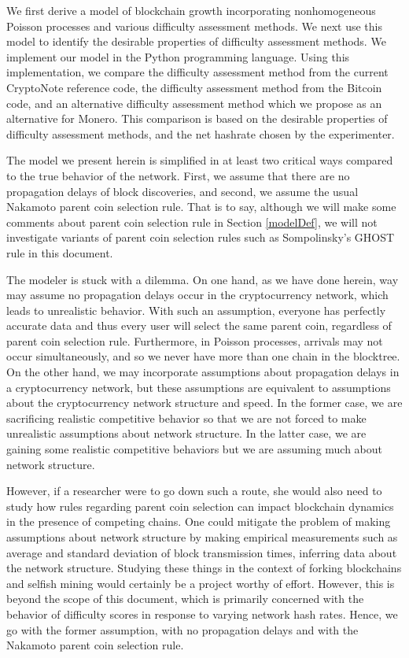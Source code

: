 \documentclass[12pt,english]{mrl}
\theoremstyle{definition}
\numberwithin{equation}{section}
\numberwithin{figure}{section}
\numberwithin{equation}{section}
\numberwithin{equation}{section}
\numberwithin{figure}{section}
\begin{document}
We first derive a model of blockchain growth incorporating nonhomogeneous Poisson processes and various difficulty assessment methods. We next use this model to identify the desirable properties of difficulty assessment methods. We implement our model in the Python programming language. Using this implementation, we compare the difficulty assessment method from the current CryptoNote reference code, the difficulty assessment method from the Bitcoin code, and an alternative difficulty assessment method which we propose as an alternative for Monero. This comparison is based on the desirable properties of difficulty assessment methods, and the net hashrate chosen by the experimenter.

The model we present herein is simplified in at least two critical ways compared to the true behavior of the network. First, we assume that there are no propagation delays of block discoveries, and second, we assume the usual Nakamoto parent coin selection rule. That is to say, although we will make some comments about parent coin selection rule in Section \ref{modelDef}, we will not investigate variants of parent coin selection rules such as Sompolinsky's GHOST rule in this document.

The modeler is stuck with a dilemma. On one hand, as we have done herein, way may assume no propagation delays occur in the cryptocurrency network, which leads to unrealistic behavior. With such an assumption, everyone has perfectly accurate data and thus every user will select the same parent coin, regardless of parent coin selection rule. Furthermore, in Poisson processes, arrivals may not occur simultaneously, and so we never have more than one chain in the blocktree. On the other hand, we may incorporate assumptions about propagation delays in a cryptocurrency network, but these assumptions are equivalent to assumptions about the cryptocurrency network structure and speed. In the former case, we are sacrificing realistic competitive behavior so that we are not forced to make unrealistic assumptions about network structure. In the latter case, we are gaining some realistic competitive behaviors but we are assuming much about network structure. 

However, if a researcher were to go down such a route, she would also need to study how rules regarding parent coin selection can impact blockchain dynamics in the presence of competing chains.  One could mitigate the problem of making assumptions about network structure by making empirical measurements such as average and standard deviation of block transmission times,  inferring data about the network structure. Studying these things in the context of forking blockchains and selfish mining would certainly be a project worthy of effort. However, this is beyond the scope of this document, which is primarily concerned with the behavior of difficulty scores in response to varying network hash rates. Hence, we go with the former assumption, with no propagation delays and with the Nakamoto parent coin selection rule.
\end{document}
